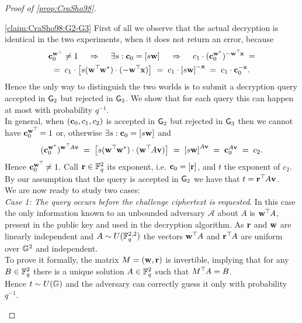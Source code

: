 \begin{proof}[Proof of \ref{prop:CraSho98}]
\begin{claimproof}{\ref{claim:CraSho98:G2-G3}}
	First of all we observe that the actual decryption is identical in the two experiments, when it does not return an error, because
	\begin{multline*}
		\mathbf{c}_0^{\mathbf{w}^\perp} \neq 1
			\quad \: \Rightarrow \: \quad
		\exists s : \mathbf{c}_0 = \left[{s \mathbf{w}}\right]_{}
			\quad \: \Rightarrow \: \quad
		c_1 \cdot (\mathbf{c}_0^{\mathbf{w}^\ast})^{-\mathbf{w}^\top\hspace{-.1em} \mathbf{x}}
			\; = \\
			= \;
		c_1 \cdot \left[{s (\mathbf{w}^\top\hspace{-.1em} \mathbf{w}^\ast) \cdot (-\mathbf{w}^\top\hspace{-.1em} \mathbf{x})}\right]_{}
			\; = \;
		c_1 \cdot \left[{s \mathbf{w}}\right]_{}^{-\mathbf{x}}
			\; = \;
		c_1 \cdot \mathbf{c}_0^{- \mathbf{x}}.
	\end{multline*}
	Hence the only way to distinguish the two worlds is to submit a decryption query accepted in $\mathsf{G}_2$ but rejected in $\mathsf{G}_3$. We show that for each query this can happen at most with probability $q^{-1}$.\\
	In general, when $(\mathbf{c}_0, c_1, c_2)$ is accepted in $\mathsf{G}_2$ but rejected in $\mathsf{G}_3$ then we cannot have $\mathbf{c}_0^{\mathbf{w}^\top\hspace{-.1em}} = 1$ or, otherwise $\exists s : \mathbf{c}_0 = \left[{s \mathbf{w}}\right]_{}$ and
	\[
		(\mathbf{c}_0^{\mathbf{w}^\ast})^{\mathbf{w}^\top\hspace{-.1em} A \mathbf{v}}
			\; = \;
		\left[{s (\mathbf{w}^\top\hspace{-.1em} \mathbf{w}^\ast) \cdot (\mathbf{w}^\top\hspace{-.1em} A \mathbf{v})}\right]_{}
			\; = \;
		\left[{s \mathbf{w}}\right]_{}^{A \mathbf{v}}
			\; = \;
		\mathbf{c}_0^{A \mathbf{v}}
			\; = \;
		c_2.
	\]
	Hence $\mathbf{c}_0^{\mathbf{w}^\top\hspace{-.1em}} \neq 1$. Call $\mathbf{r} \in \mathbb{F}_q^2$ its exponent, i.e. $\mathbf{c}_0 = \left[{\mathbf{r}}\right]_{}$, and $t$ the exponent of $c_2$. By our assumption that the query is accepted in $\mathsf{G}_2$ we have that $t = \mathbf{r}^\top\hspace{-.1em} A \mathbf{v}$.\\
	We are now ready to study two cases:\\
	
	\textit{Case 1: The query occurs before the challenge ciphertext is requested}. In this case the only information known to an unbounded adversary $\mathcal{A}$ about $A$ is $\mathbf{w}^\top\hspace{-.1em} A$, present in the public key and used in the decryption algorithm. As $\mathbf{r}$ and $\mathbf{w}$ are linearly independent and $A \sim U(\mathbb{F}_q^{2, 2})$ the vectors $\mathbf{w}^\top\hspace{-.1em} A$ and $\mathbf{r}^\top\hspace{-.1em} A$ are uniform over $\mathbb{G}^2$ and independent.\\
	To prove it formally, the matrix $M = (\mathbf{w}, \mathbf{r})$ is invertible, implying that for any $B \in \mathbb{F}_q^2$ there is a unique solution $A \in \mathbb{F}_q^2$ such that $M^\top\hspace{-.1em} A = B$.\\
	Hence $t \sim U(\mathbb{G})$ and the adversary can correctly guess it only with probability $q^{-1}$.\\
	

\end{claimproof}
\end{proof}
